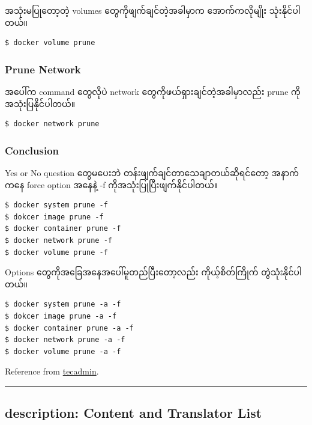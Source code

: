\documentclass{article}
\begin{document}
အသုံးမပြုတော့တဲ့ volumes တွေကိုဖျက်ချင်တဲ့အခါမှာက အောက်ကလိုမျိုး
သုံးနိုင်ပါတယ်။

\begin{verbatim}
$ docker volume prune
\end{verbatim}

\subsubsection{Prune Network}\label{prune-network}

အပေါ်က command တွေလိုပဲ network တွေကိုဖယ်ရှားချင်တဲ့အခါမှာလည်း prune
ကိုအသုံးပြနိုင်ပါတယ်။

\begin{verbatim}
$ docker network prune
\end{verbatim}

\subsubsection{Conclusion}\label{conclusion}

Yes or No question တွေမပေးဘဲ တန်းဖျက်ချင်တာသေချာတယ်ဆိုရင်တော့ အနာက်ကနေ
force option အနေနဲ့ -f ကိုအသုံးပြုပြီးဖျက်နိုင်ပါတယ်။

\begin{verbatim}
$ docker system prune -f
$ dokcer image prune -f
$ docker container prune -f
$ docker network prune -f
$ docker volume prune -f
\end{verbatim}

Options တွေကိုအခြေအနေအပေါ်မူတည်ပြီးတော့လည်း ကိုယ့်စိတ်ကြိုက်
တွဲသုံးနိုင်ပါတယ်။

\begin{verbatim}
$ docker system prune -a -f
$ dokcer image prune -a -f
$ docker container prune -a -f
$ docker network prune -a -f
$ docker volume prune -a -f
\end{verbatim}

Reference from
\href{https://tecadmin.net/tutorial/docker/docker-prune-unused-objects/}{tecadmin}.

\pagebreak

\begin{center}\rule{3in}{0.4pt}\end{center}

\subsection{description: Content and Translator
List}\label{description-content-and-translator-list}
\end{document}

